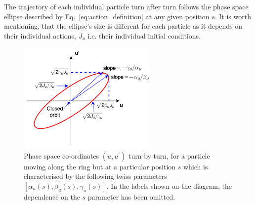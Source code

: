 The trajectory of each individual particle turn after turn follows the phase space ellipse described by Eq.~\eqref{eq:action_definition} at any given position $s$. It is worth mentioning, that the ellipse's size is different for each particle as it depends on their individual actions, $J_u$ i.e. their individual initial conditions. 


\begin{figure}[!h] %
    \centering         
    \includegraphics[width=0.6\textwidth]{images/Ch2/phase_space_ellipse.png}
        \caption{Phase space co-ordinates $(u, u^\prime)$ turn by turn, for a particle moving along the ring but at a particular position $s$ which is characterised by the following twiss parameters $[\alpha_u(s), \beta_u(s), \gamma_u(s)]$. In the labels shown on the diagram, the dependence on the $s$ parameter has been omitted.}
        \label{fig:phase_space_ellipse}
 \end{figure}


